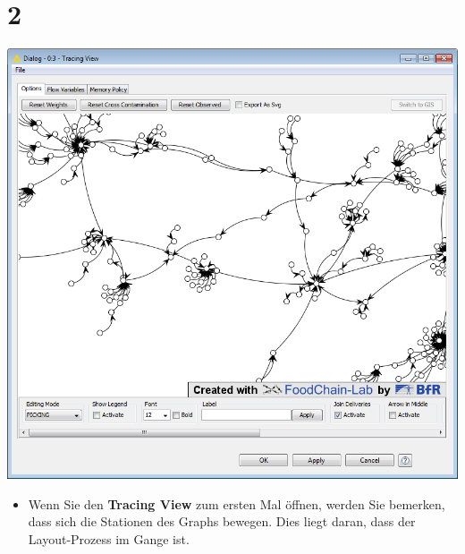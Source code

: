 \documentclass{beamer}
\begin{document}
\section{2}
\begin{frame}
	\begin{center}
  		\includegraphics[height=0.6\textheight]{2.png}
	\end{center}
	\begin{itemize}
		\item Wenn Sie den \textbf{Tracing View} zum ersten Mal öffnen, werden Sie bemerken, dass sich die Stationen des Graphs bewegen. Dies liegt daran, dass der Layout-Prozess im Gange ist.
	\end{itemize}
\end{frame}
\end{document}
